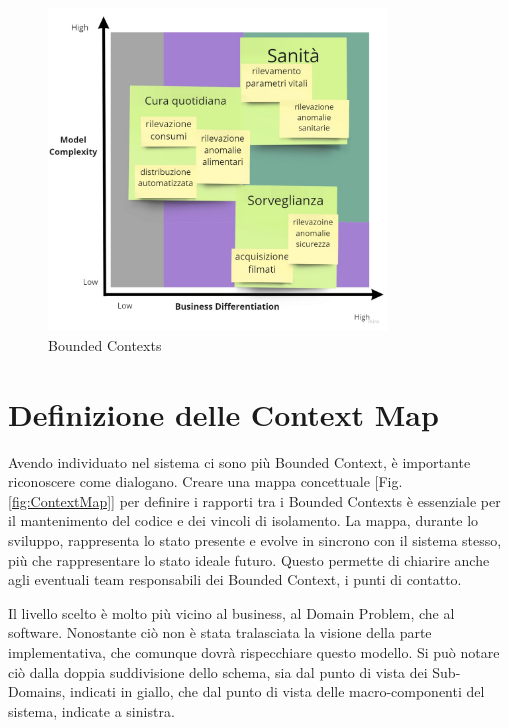     \begin{figure}[H]
        \caption{Bounded Contexts}
        \centering
        \includegraphics[width=0.8\textwidth]{Miro/BoundedContext.jpg}
    \end{figure}
    
    \section{Definizione delle Context Map}
    Avendo individuato nel sistema ci sono più Bounded Context, è importante riconoscere come dialogano. Creare una mappa concettuale [Fig. \ref{fig:ContextMap}] per definire i rapporti tra i Bounded Contexts è essenziale per il mantenimento del codice e dei vincoli di isolamento. La mappa, durante lo sviluppo, rappresenta lo stato presente e evolve in sincrono con il sistema stesso, più che rappresentare lo stato ideale futuro. Questo permette di chiarire anche agli eventuali team responsabili dei Bounded Context, i punti di contatto.
    
    Il livello scelto è molto più vicino al business, al Domain Problem, che al software. Nonostante ciò non è stata tralasciata la visione della parte implementativa, che comunque dovrà rispecchiare questo modello. Si può notare ciò dalla doppia suddivisione dello schema, sia dal punto di vista dei Sub-Domains, indicati in giallo, che dal punto di vista delle macro-componenti del sistema, indicate a sinistra. 
    
